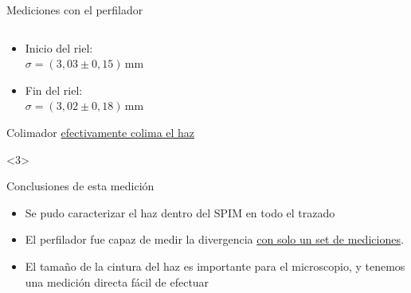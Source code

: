 \begin{frame}{Mediciones con el perfilador}
\begin{onlyenv}
\begin{columns}[t]
\begin{column}{0.5\textwidth}
    
    \end{column}
    
\end{columns}

    \begin{itemize}
            \item Inicio del riel:\\ $\sigma = (3,03 \pm 0,15)\,\text{mm}$
            \item Fin del riel:\\ $\sigma = (3,02 \pm 0,18)\,\text{mm}$
    \end{itemize}
    Colimador \underline{efectivamente colima el haz}
\end{onlyenv}





\begin{onlyenv}<3>
    \begin{block}{Conclusiones de esta medición}
        \begin{itemize}
            \item Se pudo caracterizar el haz dentro del SPIM en todo el trazado
            \item El perfilador fue capaz de medir la divergencia \underline{con solo un set de mediciones}.
            \item El tamaño de la cintura del haz es importante para el microscopio, y tenemos una medición directa fácil de efectuar
        \end{itemize}
    \end{block}
\end{onlyenv}


\end{frame}
